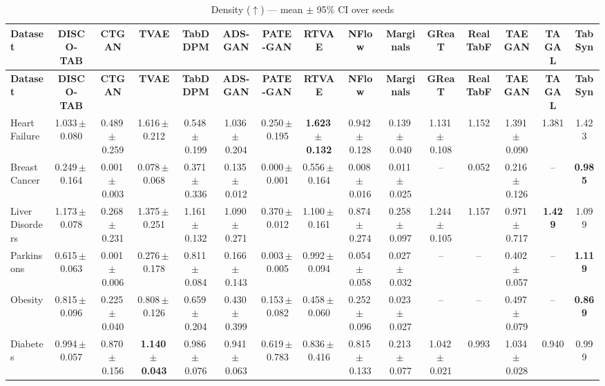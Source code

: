 \documentclass[8pt]{extarticle}
\begin{document}
\begin{longtable}{l*{14}{c}}
\caption{Density ($\uparrow$) --- mean $\pm$ 95\% CI over seeds}\\
\toprule
\textbf{Dataset} & \textbf{DISCO-TAB} & \textbf{CTGAN} & \textbf{TVAE} & \textbf{TabDDPM} & \textbf{ADS-GAN} & \textbf{PATE-GAN} & \textbf{RTVAE} & \textbf{NFlow} & \textbf{Marginals} & \textbf{GReaT} & \textbf{RealTabF} & \textbf{TAEGAN} & \textbf{TAGAL} & \textbf{TabSyn} \\
\midrule
\endfirsthead
\toprule
\textbf{Dataset} & \textbf{DISCO-TAB} & \textbf{CTGAN} & \textbf{TVAE} & \textbf{TabDDPM} & \textbf{ADS-GAN} & \textbf{PATE-GAN} & \textbf{RTVAE} & \textbf{NFlow} & \textbf{Marginals} & \textbf{GReaT} & \textbf{RealTabF} & \textbf{TAEGAN} & \textbf{TAGAL} & \textbf{TabSyn} \\
\midrule
\endhead
\bottomrule
\endfoot
Heart Failure & 1.033\,$\pm$\,0.080 & 0.489\,$\pm$\,0.259 & 1.616\,$\pm$\,0.212 & 0.548\,$\pm$\,0.199 & 1.036\,$\pm$\,0.204 & 0.250\,$\pm$\,0.195 & \textbf{1.623\,$\pm$\,0.132} & 0.942\,$\pm$\,0.128 & 0.139\,$\pm$\,0.040 & 1.131\,$\pm$\,0.108 & 1.152 & 1.391\,$\pm$\,0.090 & 1.381 & 1.423 \\
Breast Cancer & 0.249\,$\pm$\,0.164 & 0.001\,$\pm$\,0.003 & 0.078\,$\pm$\,0.068 & 0.371\,$\pm$\,0.336 & 0.135\,$\pm$\,0.012 & 0.000\,$\pm$\,0.001 & 0.556\,$\pm$\,0.164 & 0.008\,$\pm$\,0.016 & 0.011\,$\pm$\,0.025 & -- & 0.052 & 0.216\,$\pm$\,0.126 & -- & \textbf{0.985} \\
Liver Disorders & 1.173\,$\pm$\,0.078 & 0.268\,$\pm$\,0.231 & 1.375\,$\pm$\,0.251 & 1.161\,$\pm$\,0.132 & 1.090\,$\pm$\,0.271 & 0.370\,$\pm$\,0.012 & 1.100\,$\pm$\,0.161 & 0.874\,$\pm$\,0.274 & 0.258\,$\pm$\,0.097 & 1.244\,$\pm$\,0.105 & 1.157 & 0.971\,$\pm$\,0.717 & \textbf{1.429} & 1.099 \\
Parkinsons & 0.615\,$\pm$\,0.063 & 0.001\,$\pm$\,0.006 & 0.276\,$\pm$\,0.178 & 0.811\,$\pm$\,0.084 & 0.166\,$\pm$\,0.143 & 0.003\,$\pm$\,0.005 & 0.992\,$\pm$\,0.094 & 0.054\,$\pm$\,0.058 & 0.027\,$\pm$\,0.032 & -- & -- & 0.402\,$\pm$\,0.057 & -- & \textbf{1.119} \\
Obesity & 0.815\,$\pm$\,0.096 & 0.225\,$\pm$\,0.040 & 0.808\,$\pm$\,0.126 & 0.659\,$\pm$\,0.204 & 0.430\,$\pm$\,0.399 & 0.153\,$\pm$\,0.082 & 0.458\,$\pm$\,0.060 & 0.252\,$\pm$\,0.096 & 0.023\,$\pm$\,0.027 & -- & -- & 0.497\,$\pm$\,0.079 & -- & \textbf{0.869} \\
Diabetes & 0.994\,$\pm$\,0.057 & 0.870\,$\pm$\,0.156 & \textbf{1.140\,$\pm$\,0.043} & 0.986\,$\pm$\,0.076 & 0.941\,$\pm$\,0.063 & 0.619\,$\pm$\,0.783 & 0.836\,$\pm$\,0.416 & 0.815\,$\pm$\,0.133 & 0.213\,$\pm$\,0.077 & 1.042\,$\pm$\,0.021 & 0.993 & 1.034\,$\pm$\,0.028 & 0.940 & 0.999 \\

\end{longtable}
\end{document}
